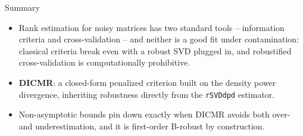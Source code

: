 \documentclass{beamer}
\begin{document}
\begin{frame}{Summary}
    \small
    \begin{itemize}
        \item Rank estimation for noisy matrices has two standard tools -- information criteria and cross-validation -- and \alert{neither is a good fit under contamination}: classical criteria break even with a robust SVD plugged in, and robustified cross-validation is computationally prohibitive.
        \pause
        \item \textbf{DICMR}: a closed-form penalized criterion built on the density power divergence, inheriting robustness directly from the \texttt{rSVDdpd} estimator.
        \pause
        \item Non-asymptotic bounds pin down exactly when DICMR avoids both over- and underestimation, and it is first-order B-robust by construction.
    \end{itemize}
\end{frame}
\end{document}
